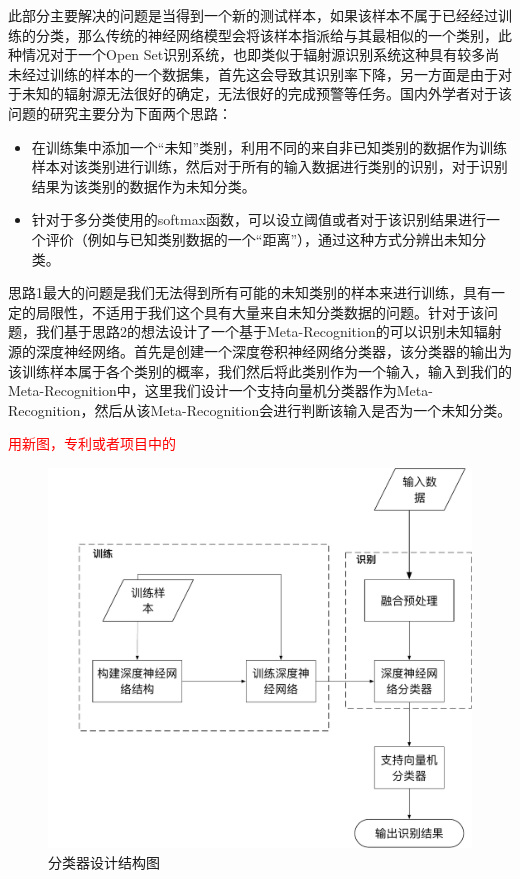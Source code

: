 此部分主要解决的问题是当得到一个新的测试样本，如果该样本不属于已经经过训练的分类，那么传统的神经网络模型会将该样本指派给与其最相似的一个类别，此种情况对于一个Open Set识别系统，也即类似于辐射源识别系统这种具有较多尚未经过训练的样本的一个数据集，首先这会导致其识别率下降，另一方面是由于对于未知的辐射源无法很好的确定，无法很好的完成预警等任务。国内外学者对于该问题的研究主要分为下面两个思路：
\begin{itemize}
	\item 在训练集中添加一个“未知”类别，利用不同的来自非已知类别的数据作为训练样本对该类别进行训练，然后对于所有的输入数据进行类别的识别，对于识别结果为该类别的数据作为未知分类。
	\item 针对于多分类使用的softmax函数，可以设立阈值或者对于该识别结果进行一个评价（例如与已知类别数据的一个“距离”），通过这种方式分辨出未知分类。
\end{itemize}
思路1最大的问题是我们无法得到所有可能的未知类别的样本来进行训练，具有一定的局限性，不适用于我们这个具有大量来自未知分类数据的问题。针对于该问题，我们基于思路2的想法设计了一个基于Meta-Recognition的可以识别未知辐射源的深度神经网络。首先是创建一个深度卷积神经网络分类器，该分类器的输出为该训练样本属于各个类别的概率，我们然后将此类别作为一个输入，输入到我们的Meta-Recognition中，这里我们设计一个支持向量机分类器作为Meta-Recognition，然后从该Meta-Recognition会进行判断该输入是否为一个未知分类。

\textcolor{red}{用新图，专利或者项目中的}

\begin{figure}
	\centering
	\includegraphics[width=\textwidth]{figures/frame_emitter.pdf}
	\caption{分类器设计结构图}
\end{figure}


